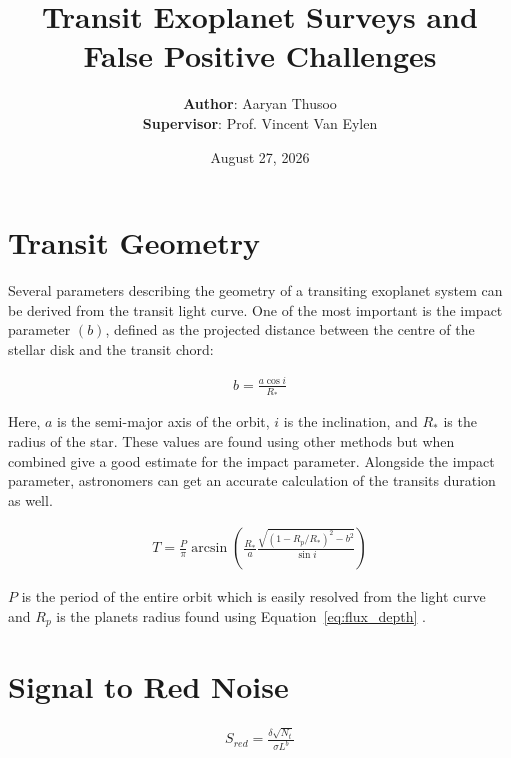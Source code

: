 \documentclass[12pt]{article}%
\title{\textbf{Transit Exoplanet Surveys and False Positive Challenges}}
\date{August 27, 2026}
\author{\textbf{Author}: Aaryan Thusoo \\ \textbf{Supervisor}: Prof. Vincent Van Eylen}
\begin{document}
\maketitle














\newpage 
\appendix \label{sec:Appendix}

\section{Transit Geometry} \label{sec:Transit_Geometry}

Several parameters describing the geometry of a transiting exoplanet system can be derived from the transit light curve. One of the most important is the impact parameter $(b)$, defined as the projected distance between the centre of the stellar disk and the transit chord:

\begin{align}
    b = \frac{a\cos{i}}{R_*}
\end{align}

Here, $a$ is the semi-major axis of the orbit, $i$ is the inclination, and $R_*$ is the radius of the star. These values are found using other methods but when combined give a good estimate for the impact parameter. Alongside the impact parameter, astronomers can get an accurate calculation of the transits duration as well. 

\begin{align}
    T = \frac{P}{\pi}\arcsin{\left(\frac{R_*}{a}\frac{\sqrt{(1-R_p/R_*)^2-b^2}}{\sin{i}}\right)}
\end{align}

$P$ is the period of the entire orbit which is easily resolved from the light curve and $R_p$ is the planets radius found using Equation~\ref{eq:flux_depth} \citep{2010exop.book...55W}. 

\section{Signal to Red Noise} \label{sec:Signal_to_Red_Noise}

\begin{align}
    S_{red}=\frac{\delta\sqrt{N_t}}{\sigma L^b}
\end{align}
\end{document}
